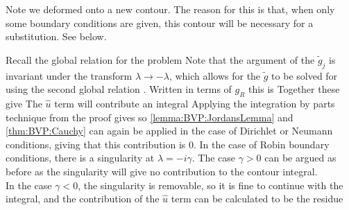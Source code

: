 \documentclass{article}
\begin{document}
\begin{idea}
Note we deformed onto a new contour. The reason for this is that, when only some boundary conditions are given, this contour will be necessary for a substitution. See below. 
\end{idea}
Recall the global relation for the problem
Note that the argument of the $\tilde{g}_j$ is invariant under the transform $\lambda \to -\lambda$, which allows for the $\tilde{g}$ to be solved for using the second global relation 
. Written in terms of $g_R$ this is
Together these give 
The $\hat{u}$ term will contribute an integral 
Applying the integration by parts technique from the proof gives 
so \ref{lemma:BVP:JordansLemma} and \ref{thm:BVP:Cauchy} can again be applied in the case of Dirichlet or Neumann conditions, giving that this contribution is 0. In the case of Robin boundary conditions, there is a singularity at $\lambda = -i\gamma$. The case $\gamma > 0$ can be argued as before as the singularity will give no contribution to the contour integral. \\
In the case $\gamma <0$, the singularity is removable, so it is fine to continue with the integral, and the contribution of the $\hat{u}$ term can be calculated to be the residue
\end{document}
